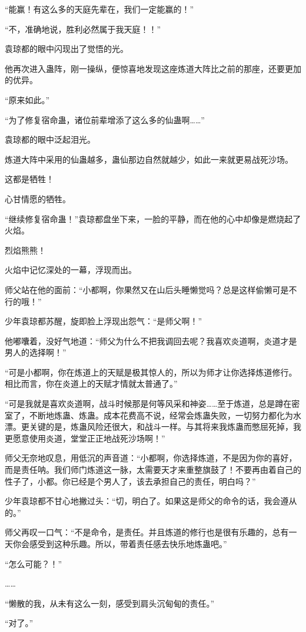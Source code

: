 \begin{this_body}
“能赢！有这么多的天庭先辈在，我们一定能赢的！”

“不，准确地说，胜利必然属于我天庭！！”

袁琼都的眼中闪现出了觉悟的光。

他再次进入蛊阵，刚一操纵，便惊喜地发现这座炼道大阵比之前的那座，还要更加的优异。

“原来如此。”

“为了修复宿命蛊，诸位前辈增添了这么多的仙蛊啊……”

袁琼都的眼中泛起泪光。

炼道大阵中采用的仙蛊越多，蛊仙那边自然就越少，如此一来就更易战死沙场。

这都是牺牲！

心甘情愿的牺牲。

“继续修复宿命蛊！”袁琼都盘坐下来，一脸的平静，而在他的心中却像是燃烧起了火焰。

烈焰熊熊！

火焰中记忆深处的一幕，浮现而出。

师父站在他的面前：“小都啊，你果然又在山后头睡懒觉吗？总是这样偷懒可是不行的哦！”

少年袁琼都苏醒，旋即脸上浮现出怨气：“是师父啊！”

他嘟囔着，没好气地道：“师父为什么不把我调回去呢？我喜欢炎道啊，炎道才是男人的选择啊！”

“可是小都啊，你在炼道上的天赋是极其惊人的，所以为师才让你选择炼道修行。相比而言，你在炎道上的天赋才情就太普通了。”

“可是我就是喜欢炎道啊，战斗时候那是何等风采和神姿……至于炼道，总是蹲在密室了，不断地炼蛊、炼蛊。成本花费高不说，经常会炼蛊失败，一切努力都化为水漂。更关键的是，炼蛊风险还很大，和战斗一样。与其将来我炼蛊而憋屈死掉，我更愿意使用炎道，堂堂正正地战死沙场啊！”

师父无奈地叹息，用低沉的声音道：“小都啊，你选择炼道，不是因为你的喜好，而是责任呐。我们师门炼道这一脉，太需要天才来重整旗鼓了！不要再由着自己的性子了，小都。你已经是个男人了，该去承担自己的责任，明白吗？”

少年袁琼都不甘心地撇过头：“切，明白了。如果这是师父的命令的话，我会遵从的。”

师父再叹一口气：“不是命令，是责任。并且炼道的修行也是很有乐趣的，总有一天你会感受到这种乐趣。所以，带着责任感去快乐地炼蛊吧。”

“怎么可能？！”

……

“懒散的我，从未有这么一刻，感受到肩头沉甸甸的责任。”

“对了。”


\end{this_body}
